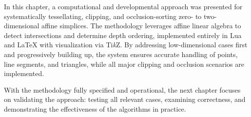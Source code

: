 In this chapter, a computational and developmental approach was presented 
for systematically tessellating, clipping, and occlusion-sorting 
zero- to two-dimensional affine simplices. The methodology leverages 
affine linear algebra to detect intersections and determine depth 
ordering, implemented entirely in Lua and \LaTeX{} with visualization 
via Ti\textit{k}Z. By addressing low-dimensional cases first and 
progressively building up, the system ensures accurate handling of 
points, line segments, and triangles, while all major clipping and 
occlusion scenarios are implemented.

With the methodology fully specified and operational, the next chapter 
focuses on validating the approach: testing all relevant cases, 
examining correctness, and demonstrating the effectiveness of the 
algorithms in practice.
